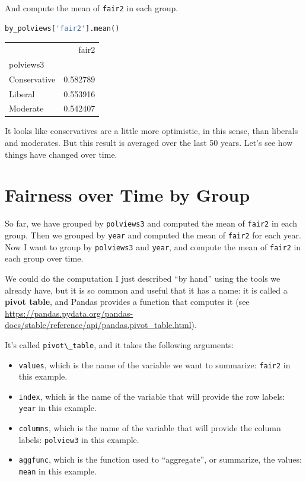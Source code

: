 And compute the mean of \passthrough{\lstinline!fair2!} in each group.

\begin{lstlisting}[language=Python,style=source]
by_polviews['fair2'].mean()
\end{lstlisting}

\begin{tabular}{lr}
\toprule
{} &     fair2 \\
polviews3    &           \\
\midrule
Conservative &  0.582789 \\
Liberal      &  0.553916 \\
Moderate     &  0.542407 \\
\bottomrule
\end{tabular}

It looks like conservatives are a little more optimistic, in this sense,
than liberals and moderates. But this result is averaged over the last
50 years. Let's see how things have changed over time.

\hypertarget{fairness-over-time-by-group}{%
\section{Fairness over Time by
Group}\label{fairness-over-time-by-group}}

So far, we have grouped by \passthrough{\lstinline!polviews3!} and
computed the mean of \passthrough{\lstinline!fair2!} in each group. Then
we grouped by \passthrough{\lstinline!year!} and computed the mean of
\passthrough{\lstinline!fair2!} for each year. Now I want to group by
\passthrough{\lstinline!polviews3!} and \passthrough{\lstinline!year!},
and compute the mean of \passthrough{\lstinline!fair2!} in each group
over time.

We could do the computation I just described ``by hand'' using the tools
we already have, but it is so common and useful that it has a name: it
is called a \textbf{pivot table}, and Pandas provides a function that
computes it (see
\url{https://pandas.pydata.org/pandas-docs/stable/reference/api/pandas.pivot_table.html}).

It's called \passthrough{\lstinline!pivot\_table!}, and it takes the
following arguments:

\begin{itemize}
\item
  \passthrough{\lstinline!values!}, which is the name of the variable we
  want to summarize: \passthrough{\lstinline!fair2!} in this example.
\item
  \passthrough{\lstinline!index!}, which is the name of the variable
  that will provide the row labels: \passthrough{\lstinline!year!} in
  this example.
\item
  \passthrough{\lstinline!columns!}, which is the name of the variable
  that will provide the column labels:
  \passthrough{\lstinline!polview3!} in this example.
\item
  \passthrough{\lstinline!aggfunc!}, which is the function used to
  ``aggregate'', or summarize, the values:
  \passthrough{\lstinline!mean!} in this example.
\end{itemize}

